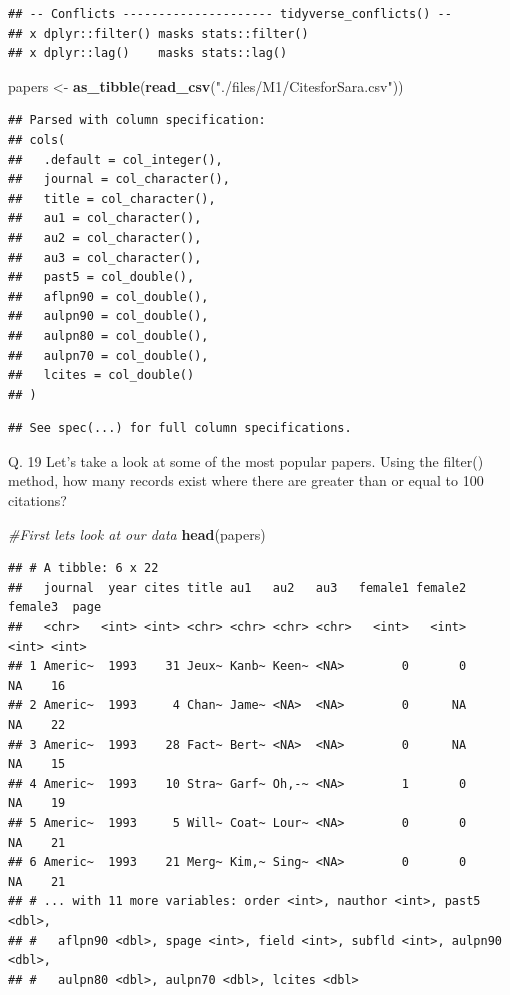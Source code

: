 \documentclass[]{book}
\newenvironment{Shaded}{\begin{snugshade}}{\end{snugshade}}
\newcommand{\KeywordTok}[1]{\textcolor[rgb]{0.13,0.29,0.53}{\textbf{#1}}}
\newcommand{\StringTok}[1]{\textcolor[rgb]{0.31,0.60,0.02}{#1}}
\newcommand{\CommentTok}[1]{\textcolor[rgb]{0.56,0.35,0.01}{\textit{#1}}}
\newcommand{\NormalTok}[1]{#1}
\theoremstyle{definition}
\theoremstyle{definition}
\theoremstyle{definition}
\theoremstyle{remark}
\begin{document}
\begin{verbatim}
## -- Conflicts --------------------- tidyverse_conflicts() --
## x dplyr::filter() masks stats::filter()
## x dplyr::lag()    masks stats::lag()
\end{verbatim}

\begin{Shaded}
\begin{Highlighting}[]
\NormalTok{papers <-}\StringTok{ }\KeywordTok{as_tibble}\NormalTok{(}\KeywordTok{read_csv}\NormalTok{(}\StringTok{"./files/M1/CitesforSara.csv"}\NormalTok{))}
\end{Highlighting}
\end{Shaded}

\begin{verbatim}
## Parsed with column specification:
## cols(
##   .default = col_integer(),
##   journal = col_character(),
##   title = col_character(),
##   au1 = col_character(),
##   au2 = col_character(),
##   au3 = col_character(),
##   past5 = col_double(),
##   aflpn90 = col_double(),
##   aulpn90 = col_double(),
##   aulpn80 = col_double(),
##   aulpn70 = col_double(),
##   lcites = col_double()
## )
\end{verbatim}

\begin{verbatim}
## See spec(...) for full column specifications.
\end{verbatim}

Q. 19 Let's take a look at some of the most popular papers. Using the
filter() method, how many records exist where there are greater than or
equal to 100 citations?

\begin{Shaded}
\begin{Highlighting}[]
\CommentTok{#First lets look at our data}
\KeywordTok{head}\NormalTok{(papers)}
\end{Highlighting}
\end{Shaded}

\begin{verbatim}
## # A tibble: 6 x 22
##   journal  year cites title au1   au2   au3   female1 female2 female3  page
##   <chr>   <int> <int> <chr> <chr> <chr> <chr>   <int>   <int>   <int> <int>
## 1 Americ~  1993    31 Jeux~ Kanb~ Keen~ <NA>        0       0      NA    16
## 2 Americ~  1993     4 Chan~ Jame~ <NA>  <NA>        0      NA      NA    22
## 3 Americ~  1993    28 Fact~ Bert~ <NA>  <NA>        0      NA      NA    15
## 4 Americ~  1993    10 Stra~ Garf~ Oh,-~ <NA>        1       0      NA    19
## 5 Americ~  1993     5 Will~ Coat~ Lour~ <NA>        0       0      NA    21
## 6 Americ~  1993    21 Merg~ Kim,~ Sing~ <NA>        0       0      NA    21
## # ... with 11 more variables: order <int>, nauthor <int>, past5 <dbl>,
## #   aflpn90 <dbl>, spage <int>, field <int>, subfld <int>, aulpn90 <dbl>,
## #   aulpn80 <dbl>, aulpn70 <dbl>, lcites <dbl>
\end{verbatim}
\end{document}
